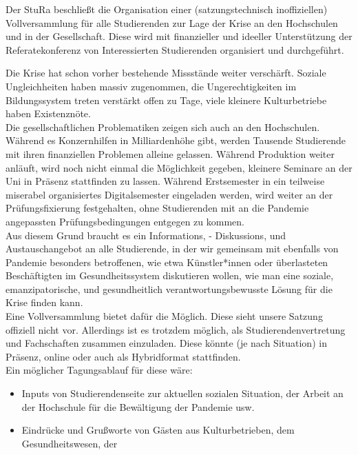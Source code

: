     {
        Der StuRa beschließt die Organisation einer (satzungstechnisch inoffiziellen) Vollversammlung
        für alle Studierenden zur Lage der Krise an den Hochschulen und in der Gesellschaft.
        Diese wird mit finanzieller und ideeller Unterstützung der Referatekonferenz von Interessierten
        Studierenden organisiert und durchgeführt. 
    }{
        Die Krise hat schon vorher bestehende Missstände weiter verschärft. Soziale Ungleichheiten haben
        massiv zugenommen, die Ungerechtigkeiten im Bildungssystem treten verstärkt offen zu Tage, viele
        kleinere Kulturbetriebe haben Existenznöte.\\
        Die gesellschaftlichen Problematiken zeigen sich auch an den Hochschulen. Während es Konzernhilfen
        in Milliardenhöhe gibt, werden Tausende Studierende mit ihren finanziellen Problemen alleine
        gelassen. Während Produktion weiter anläuft, wird noch nicht einmal die Möglichkeit gegeben,
        kleinere Seminare an der Uni in Präsenz stattfinden zu lassen. Während Erstsemester in ein
        teilweise miserabel organisiertes Digitalsemester eingeladen werden, wird weiter an der
        Prüfungsfixierung festgehalten, ohne Studierenden mit an die Pandemie angepassten Prüfungsbedingungen
        entgegen zu kommen.\\
        Aus diesem Grund braucht es ein Informations, - Diskussions, und Austauschangebot an alle 
        Studierende, in der wir gemeinsam mit ebenfalls von Pandemie besonders betroffenen, wie etwa
        Künstler*innen oder überlasteten Beschäftigten im Gesundheitssystem diskutieren wollen, wie man eine
        soziale, emanzipatorische, und gesundheitlich verantwortungsbewusste Lösung für die Krise finden
        kann.\\
        Eine Vollversammlung bietet dafür die Möglich. Diese sieht unsere Satzung offiziell nicht vor.
        Allerdings ist es trotzdem möglich, als Studierendenvertretung und Fachschaften zusammen einzuladen.
        Diese könnte (je nach Situation) in Präsenz, online oder auch als Hybridformat stattfinden.\\
        Ein möglicher Tagungsablauf für diese wäre:\\
        \begin{itemize}
            \item Inputs von Studierendenseite zur aktuellen sozialen Situation, der Arbeit an der Hochschule
                für die Bewältigung der Pandemie usw.
            \item Eindrücke und Grußworte von Gästen aus Kulturbetrieben, dem Gesundheitswesen, der

\end{itemize}}
